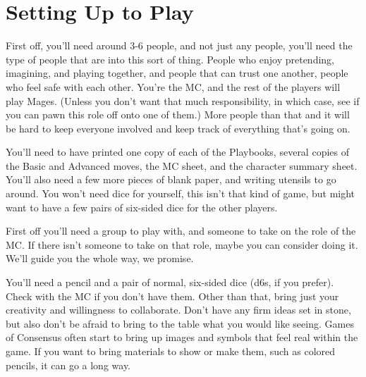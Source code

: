 \documentclass[
  oneside,
  statementpaper,
  9pt]{memoir}
\begin{document}
\hypertarget{setting-up-to-play}{%
\section{Setting Up to Play}\label{setting-up-to-play}}

\begin{MC}

First off, you’ll need around 3-6 people, and not just any people, you’ll need the type of people that are into this sort of thing. People who enjoy pretending, imagining, and playing together, and people that can trust one another, people who feel safe with each other. You're the MC, and the rest of the players will play Mages. (Unless you don't want that much responsibility, in which case, see if you can pawn this role off onto one of them.) More people than that and it will be hard to keep everyone involved and keep track of everything that’s going on.

You’ll need to have printed one copy of each of the Playbooks, several copies of the Basic and Advanced moves, the MC sheet, and the character summary sheet. You’ll also need a few more pieces of blank paper, and writing utensils to go around. You won't need dice for yourself, this isn't that kind of game, but might want to have a few pairs of six-sided dice for the other players.

\end{MC}

\begin{Player}

First off you'll need a group to play with, and someone to take on the role of the MC. If there isn't someone to take on that role, maybe you can consider doing it. We'll guide you the whole way, we promise.

You'll need a pencil and a pair of normal, six-sided dice (d6s, if you prefer). Check with the MC if you don't have them. Other than that, bring just your creativity and willingness to collaborate. Don't have any firm ideas set in stone, but also don't be afraid to bring to the table what you would like seeing. Games of Consensus often start to bring up images and symbols that feel real within the game. If you want to bring materials to show or make them, such as colored pencils, it can go a long way.

\end{Player}
\end{document}
